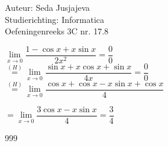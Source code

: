 \documentclass[a4paper]{article}
\newcommand{\limit}{\lim\limits}
\begin{document}
\noindent \large Auteur: Seda Jusjajeva\\
\noindent \large Studierichting: Informatica\\
\noindent \large Oefeningenreeks 3C nr. 17.8 \\

\medskip

\normalsize


$\limit_{x\to0}\dfrac{1 - \cos x + x\sin x}{2x^2} = \dfrac{0}{0}$ \\

$\stackrel{(H)}{=}\limit_{x\to0}\dfrac{\sin x + x\cos x + \sin x}{4x} = \dfrac{0}{0}$ \\

$\stackrel{(H)}{=}\limit_{x\to0}\dfrac{\cos x + \cos x - x\sin x + \cos x}{4}$

$= \limit_{x\to0}\dfrac{3\cos x - x\sin x}{4} = \dfrac{3}{4}$


\begin{thebibliography}{999}
\end{thebibliography}
\end{document}

